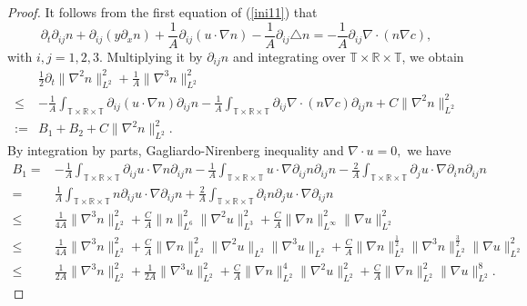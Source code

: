 \documentclass[12pt, reqno]{amsart}
\numberwithin{equation}{section}
\begin{document}
\begin{proof}
It follows from the first equation of (\ref{ini11}) that
		\begin{equation*}
			\partial_{t}\partial_{ij}n+\partial_{ij}(y\partial_{x}n)+\frac{1}{A}\partial_{ij}(u\cdot\nabla n)-\frac{1}{A}\partial_{ij}\triangle n=-\frac{1}{A}\partial_{ij}\nabla\cdot(n\nabla c),
		\end{equation*}
		with $ i,j=1,2,3. $ Multiplying it by $ \partial_{ij}n $ and integrating  over $ \mathbb{T}\times\mathbb{R}\times\mathbb{T} $, we obtain
		\begin{equation}\label{eq B}
			\begin{aligned}
			&\frac12\partial_{t}\|\nabla^{2}n\|_{L^{2}}^{2}+\frac{1}{A}\|\nabla^{3}n\|_{L^{2}}^{2}\\ \leq &-\frac{1}{A}\int_{\mathbb{T}\times\mathbb{R}\times\mathbb{T}}\partial_{ij}(u\cdot\nabla n)\partial_{ij}n-\frac{1}{A}\int_{\mathbb{T}\times\mathbb{R}\times\mathbb{T}}\partial_{ij}\nabla\cdot(n\nabla c)\partial_{ij}n+ C\|\nabla^{2}n\|_{L^{2}}^{2}\\
:=&B_{1}+B_{2}+C\|\nabla^{2}n\|_{L^{2}}^{2}.
			\end{aligned}
		\end{equation}
		By integration by parts, Gagliardo-Nirenberg inequality and $ \nabla\cdot u=0, $ we have
		\begin{equation*}
			\begin{aligned}
			B_{1}=&-\frac{1}{A}\int_{\mathbb{T}\times\mathbb{R}\times\mathbb{T}}\partial_{ij}u\cdot\nabla n\partial_{ij}n-\frac{1}{A}\int_{\mathbb{T}\times\mathbb{R}\times\mathbb{T}}u\cdot\nabla\partial_{ij}n\partial_{ij}n-\frac{2}{A}\int_{\mathbb{T}\times\mathbb{R}\times\mathbb{T}}\partial_{j}u\cdot\nabla\partial_{i}n\partial_{ij}n
\\=&\frac{1}{A}\int_{\mathbb{T}\times\mathbb{R}\times\mathbb{T}}n\partial_{ij}u\cdot\nabla\partial_{ij}n+\frac{2}{A}\int_{\mathbb{T}\times\mathbb{R}\times\mathbb{T}}\partial_{i}n\partial_{j}u\cdot\nabla\partial_{ij}n
\\\leq&\frac{1}{4A}\|\nabla^{3}n\|_{L^{2}}^{2}+\frac{C}{A}\|n\|_{L^{6}}^{2}\|\nabla^{2}u\|_{L^{3}}^{2}+\frac{C}{A}\|\nabla n\|_{L^{\infty}}^{2}\|\nabla u\|_{L^{2}}^{2}\\\leq&\frac{1}{4A}\|\nabla^{3}n\|_{L^{2}}^{2}+\frac{C}{A}\|\nabla n\|_{L^{2}}^{2}\|\nabla^{2}u\|_{L^{2}}\|\nabla^{3}u\|_{L^{2}}+\frac{C}{A}\|\nabla n\|_{L^{2}}^{\frac12}\|\nabla^{3}n\|_{L^{2}}^{\frac32}\|\nabla u\|_{L^{2}}^{2}\\\leq&\frac{1}{2A}\|\nabla^{3}n\|_{L^{2}}^{2}+\frac{1}{2A}\|\nabla^{3}u\|_{L^{2}}^{2}+\frac{C}{A}\|\nabla n\|_{L^{2}}^{4}\|\nabla^{2}u\|_{L^{2}}^{2}+\frac{C}{A}\|\nabla n\|_{L^{2}}^{2}\|\nabla u\|_{L^{2}}^{8}.

\end{aligned}
\end{equation*}
\end{proof}
\end{document}
